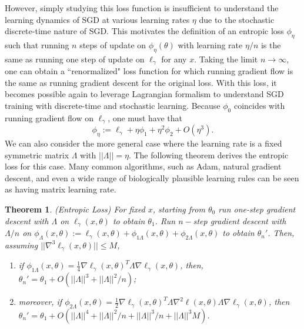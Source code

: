 \documentclass{article}
\theoremstyle{plain}
\newtheorem{theorem}{Theorem}
\begin{document}
However, simply studying this loss function is insufficient to understand the learning dynamics of SGD at various learning rates $\eta$ due to the stochastic discrete-time nature of SGD. This motivates the definition of an entropic loss $\phi_\eta$ such that running $n$ steps of update on $\phi_\eta(\theta)$ with learning rate $\eta/n$ is the same as running one step of update on $\ell_\gamma$ for any $x$. Taking the limit $n \to \infty$, one can obtain a ``renormalized" loss function for which running gradient flow is the same as running gradient descent for the original loss. With this loss, it becomes possible again to leverage Lagrangian formalism to understand SGD training with discrete-time and stochastic learning. Because $\phi_0$ coincides with running gradient flow on $\ell_\gamma$, one must have that 
\begin{equation}
    \phi_\eta := \ell_\gamma + \eta \phi_1 + \eta^2 \phi_2 + O(\eta^3).
\end{equation}
We can also consider the more general case where the learning rate is a fixed symmetric matrix $\Lambda$ with $||\Lambda||=\eta$. The following theorem derives the entropic loss for this case. Many common algorithms, such as Adam, natural gradient descent, and even a wide range of biologically plausible learning rules \cite{ziyin2025heterosynaptic} can be seen as having matrix learning rate.



\begin{theorem}\label{theo: effective loss} (Entropic Loss)
For fixed $x$, starting from $\theta_0$ run one-step gradient descent with $\Lambda$ on $\ell_\gamma(x,\theta)$ to obtain $\theta_1$. Run $n-$step gradient descent with $\Lambda/n$ on $\phi_\Lambda(x,\theta):=\ell_\gamma(x,\theta)+\phi_{1\Lambda}(x,\theta)+\phi_{2\Lambda}(x,\theta)$ to obtain $\theta_n'$. Then, assuming $||\nabla^3\ell_\gamma(x,\theta)||\leq M$,
\begin{enumerate}[noitemsep,topsep=0pt, parsep=0pt,partopsep=0pt, leftmargin=15pt]
    \item if $\phi_{1\Lambda}(x,\theta) = \frac{1}{4}\nabla\ell_\gamma(x,\theta)^T\Lambda\nabla\ell_\gamma(x,\theta)$, then, $\theta_n'=\theta_1+O(||\Lambda||^3+||\Lambda||^2/n)$;
    \item moreover, if $\phi_{2\Lambda}(x,\theta)=\frac{1}{2}\nabla\ell_\gamma(x,\theta)^T\Lambda\nabla^2\ell(x,\theta)\Lambda\nabla\ell_\gamma(x,\theta)$, then $\theta_n'=\theta_1+O(||\Lambda||^4+||\Lambda||^2/n+||\Lambda||^3/n+||\Lambda||^3M)$.
\end{enumerate}
\end{theorem}
\end{document}

